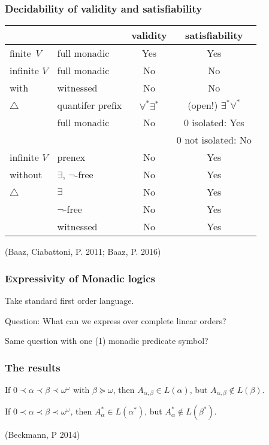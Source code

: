 \documentclass[aspectratio=169]%
  {beamer}
\newcommand{\cutin}[1]{%
\frame[c]{\begin{center}{\Large\bf\color{blue}#1}\end{center}}}
\newcommand{\al}{\alpha}
\newcommand{\be}{\beta}
\newcommand{\om}[1]{\omega^{#1}}
\newcommand\bd{\bigtriangleup} %
\begin{document}
\begin{frame}
  \frametitle{Decidability of validity and satisfiability}
  \begin{center}
\begin{tabular}[ht]{l|l|c|c}
  \toprule
      \multicolumn{2}{c|}{} & validity & satisfiability \\
  \midrule
  finite~$V$ & full monadic & Yes  & Yes \\
  \midrule
  infinite $V$ & full monadic    & No  & No  \\
  with         & witnessed       & No  & No  \\
  $\bd$        & quantifer prefix & $\forall^*\exists^*$ & (open!) $\exists^*\forall^*$\\
  \midrule
               & full monadic    & No  & $0$ isolated: Yes \\
               &                 &     & $0$ not isolated: No \\
  infinite $V$ & prenex          & No  & Yes \\
  without      & $\exists$, $\lnot$-free & No & Yes \\
  $\bd$        & $\exists$       & No  & Yes \\
               & $\lnot$-free    & No  & Yes \\
               & witnessed       & No  & Yes \\
  \bottomrule
\end{tabular}
\end{center}
  (Baaz, Ciabattoni, P. 2011; Baaz, P. 2016)
\end{frame}

  
\begin{frame}
  \frametitle{Expressivity of Monadic logics}
  \begin{center}
    Take standard first order language.

    \bigskip
    Question: What can we express over complete linear orders?

    \pause
    \bigskip
    Same question with one (1) monadic predicate symbol?
  \end{center}
\end{frame}

\begin{frame}
  \frametitle{The results}
  \begin{theorem}
    If $0\prec\al\prec\be\prec\om{\omega}$ with $\be\succeq\omega$, then
    $A_{\alpha,\beta} \in L(\alpha)$, 
    but $A_{\alpha,\beta} \not\in L(\beta)$.
  \end{theorem}

  \pause
  \begin{theorem}
  If $0\prec\al\prec\be\prec\om{\omega}$, then
  $A^*_\al \in L(\al^*)$, 
  but $A^*_\al \notin L(\be^*)$.
  \end{theorem}

  (Beckmann, P 2014)
\end{frame}
\end{document}
